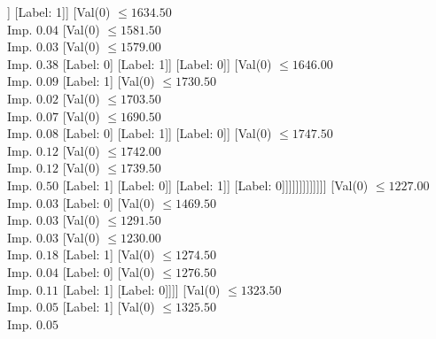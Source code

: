 \documentclass[margin=10pt]{standalone}
\begin{document}
\begin{forest}
												[Label: 1]
												[Val($0$) $ \leq 1554.00$ \\ Imp. $0.01$
													[Label: 0]
													[Val($0$) $ \leq 1570.50$ \\ Imp. $0.05$
														[Val($0$) $ \leq 1565.50$ \\ Imp. $0.05$
															[Val($0$) $ \leq 1559.50$ \\ Imp. $0.11$
																[Label: 1]
																[Label: 0]]
															[Label: 1]]
														[Val($0$) $ \leq 1634.50$ \\ Imp. $0.04$
															[Val($0$) $ \leq 1581.50$ \\ Imp. $0.03$
																[Val($0$) $ \leq 1579.00$ \\ Imp. $0.38$
																	[Label: 0]
																	[Label: 1]]
																[Label: 0]]
															[Val($0$) $ \leq 1646.00$ \\ Imp. $0.09$
																[Label: 1]
																[Val($0$) $ \leq 1730.50$ \\ Imp. $0.02$
																	[Val($0$) $ \leq 1703.50$ \\ Imp. $0.07$
																		[Val($0$) $ \leq 1690.50$ \\ Imp. $0.08$
																			[Label: 0]
																			[Label: 1]]
																		[Label: 0]]
																	[Val($0$) $ \leq 1747.50$ \\ Imp. $0.12$
																		[Val($0$) $ \leq 1742.00$ \\ Imp. $0.12$
																			[Val($0$) $ \leq 1739.50$ \\ Imp. $0.50$
																				[Label: 1]
																				[Label: 0]]
																			[Label: 1]]
																		[Label: 0]]]]]]]]]]]]]
						[Val($0$) $ \leq 1227.00$ \\ Imp. $0.03$
							[Label: 0]
							[Val($0$) $ \leq 1469.50$ \\ Imp. $0.03$
								[Val($0$) $ \leq 1291.50$ \\ Imp. $0.03$
									[Val($0$) $ \leq 1230.00$ \\ Imp. $0.18$
										[Label: 1]
										[Val($0$) $ \leq 1274.50$ \\ Imp. $0.04$
											[Label: 0]
											[Val($0$) $ \leq 1276.50$ \\ Imp. $0.11$
												[Label: 1]
												[Label: 0]]]]
									[Val($0$) $ \leq 1323.50$ \\ Imp. $0.05$
										[Label: 1]
										[Val($0$) $ \leq 1325.50$ \\ Imp. $0.05$

\end{forest}
\end{document}
